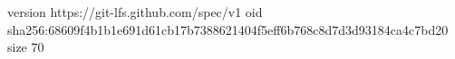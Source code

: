 version https://git-lfs.github.com/spec/v1
oid sha256:68609f4b1b1e691d61cb17b7388621404f5eff6b768c8d7d3d93184ca4c7bd20
size 70
